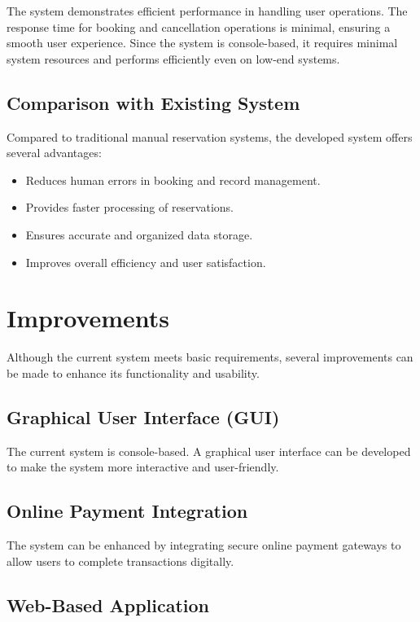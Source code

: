 The system demonstrates efficient performance in handling user operations. The response time for booking and cancellation operations is minimal, ensuring a smooth user experience. Since the system is console-based, it requires minimal system resources and performs efficiently even on low-end systems.

\subsection{Comparison with Existing System}

Compared to traditional manual reservation systems, the developed system offers several advantages:

\begin{itemize}
\item Reduces human errors in booking and record management.
\item Provides faster processing of reservations.
\item Ensures accurate and organized data storage.
\item Improves overall efficiency and user satisfaction.
\end{itemize}

\section{Improvements}

Although the current system meets basic requirements, several improvements can be made to enhance its functionality and usability.

\subsection{Graphical User Interface (GUI)}

The current system is console-based. A graphical user interface can be developed to make the system more interactive and user-friendly.

\subsection{Online Payment Integration}

The system can be enhanced by integrating secure online payment gateways to allow users to complete transactions digitally.

\subsection{Web-Based Application}

